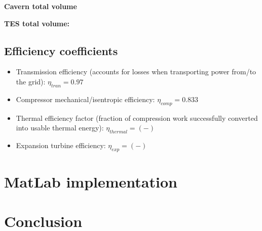 \textbf{Cavern total volume}

\textbf{TES total volume:}

\subsection{Efficiency coefficients}

\begin{itemize}
    \item Transmission efficiency (accounts for losses when transporting power from/to the grid): $\eta_{tran}=0.97$
    \item Compressor mechanical/isentropic efficiency: $\eta_{comp}=0.833$
    \item Thermal efficiency factor (fraction of compression work successfully converted into usable thermal energy): $\eta_{thermal}=(-)$
    \item Expansion turbine efficiency: $\eta_{exp}=(-)$
\end{itemize}


 

  
\section{MatLab implementation}
\section{Conclusion}